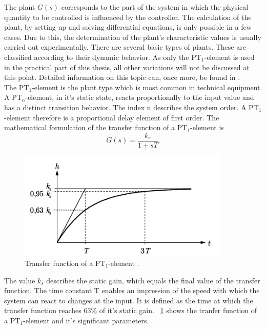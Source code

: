 The plant $G(s)$ corresponds to the part of the system in which the physical quantity to be controlled is influenced by the controller. The calculation of the plant, by setting up and solving differential equations, is only possible in a few cases. Due to this, the determination of the plant's characteristic values is usually carried out experimentally. There are several basic types of plants. These are classified according to their dynamic behavior. As only the PT$_{1}$-element is used in the practical part of this thesis, all other variations will not be discussed at this point. Detailed information on this topic can, once more, be found in \cite{Reg_10}.
\\The PT$_{1}$-element is the plant type which is most common in technical equipment. A PT$_{n}$-element, in it's static state, reacts proportionally to the input value and has a distinct transition behavior. The index n describes the system order. A PT$_{1}$-element therefore is a proportional delay element of first order. The mathematical formulation of the transfer function of a PT$_{1}$-element is
\begin{equation}
    G(s) = \frac{k_{s}}{1+sT}.
 \label{eq:tf_pt1}
\end{equation}

\begin{figure}[h]
   \centering
   \includegraphics[width=0.9\textwidth]{images/tf_pt1.jpg}
   \caption[Tranfer function of a PT$_{1}$-element]{Transfer function of a PT$_{1}$-element \cite{Reg_10}.}
   \label{fig:tf_pt1}
 \end{figure}
The value $k_{s}$ describes the static gain, which equals the final value of the transfer function. The time constant T enables an impression of the speed with which the system can react to changes at the input. It is defined as the time at which the transfer function reaches 63\% of it's static gain.\cite{Reg_10}
\figurename~\ref{fig:tf_pt1} shows the tranfer function of a PT$_{1}$-element and it's significant parameters.


